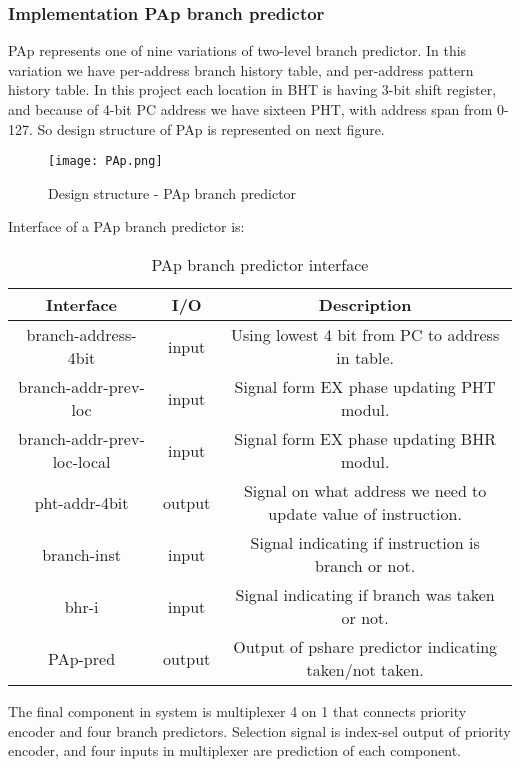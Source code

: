 \documentclass{scrreprt}
\begin{document}
\subsubsection*{Implementation PAp branch predictor}
PAp represents one of nine variations of two-level branch predictor. In this variation we have per-address branch history table, and per-address pattern history table. In this project each location in BHT is having 3-bit shift register, and because of 4-bit PC address we have sixteen PHT, with address span from 0-127. So design structure of PAp is represented on next figure. 
\begin{figure}[htb!]
    \centering
    \texttt{[image: PAp.png]}
    \caption{Design structure - PAp branch predictor}
    \label{fig:PAp}
\end{figure}
\newline
Interface of a PAp branch predictor is: 
\begin{table}[htb!]
            \centering
            \begin{tabular}{|c|c|c|} \hline 
             Interface & I/O & Description \\ \hline  
             branch-address-4bit & input & Using lowest 4 bit from PC to address in table. \\ \hline
             branch-addr-prev-loc & input & Signal form EX phase updating PHT modul.  \\ \hline
             branch-addr-prev-loc-local & input & Signal form EX phase updating BHR modul.  \\ \hline
             pht-addr-4bit & output & Signal on what address we need to update value of instruction.  \\ 
             \hline
             branch-inst & input & Signal indicating if instruction is branch or not.  \\ \hline
             bhr-i & input & Signal indicating if branch was taken or not.  \\ \hline
             PAp-pred & output & Output of pshare predictor indicating taken/not taken.  \\ \hline
        \end{tabular}
        \caption{PAp branch predictor interface}
        \label{tab:PApI}
    \end{table}
\newline
The final component in system is multiplexer 4 on 1 that connects priority encoder and four branch predictors. Selection signal is index-sel output of priority encoder, and four inputs in multiplexer are prediction of each component. 
\newpage
{} 
\end{document}
